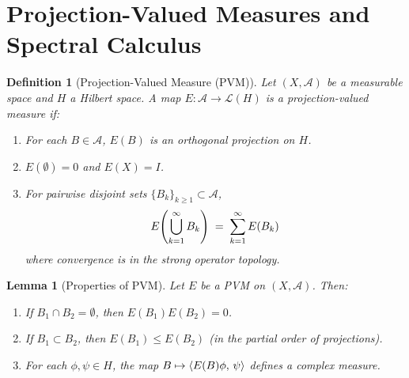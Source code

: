 \documentclass{article}
\newcommand{\tmem}[1]{{\em #1\/}}
\newtheorem{definition}{Definition}
\newtheorem{lemma}{Lemma}
\newcommand{\1}{\mathbbm{1}}
\newcommand{\ip}[2]{\left\langle #1, \hspace{0.17em} #2  \right\rangle}
\begin{document}
\section{Projection-Valued Measures and Spectral Calculus}

\begin{definition}
  [Projection-Valued Measure (PVM)] Let $(X, \mathcal{A})$ be a measurable
  space and $H$ a Hilbert space. A map $E : \mathcal{A} \to \mathcal{L} (H)$
  is a {\tmem{projection-valued measure}} if:
  \begin{enumerate}
    \item For each $B \in \mathcal{A}$, $E (B)$ is an orthogonal projection on
    $H$.
    
    \item $E (\emptyset) = 0$ and $E (X) = I$.
    
    \item For pairwise disjoint sets $\{B_k \}_{k \geq 1} \subset
    \mathcal{A}$,
    \begin{equation}
      E \hspace{-0.17em} \left( \bigcup_{k = 1}^{\infty} B_k \right)
      \hspace{0.27em} = \hspace{0.27em} \sum_{k = 1}^{\infty} E (B_k)
    \end{equation}
    where convergence is in the strong operator topology.
  \end{enumerate}
\end{definition}

\begin{lemma}
  [Properties of PVM]\label{lem:pvm_properties} Let $E$ be a PVM on $(X,
  \mathcal{A})$. Then:
  \begin{enumerate}
    \item If $B_1 \cap B_2 = \emptyset$, then $E (B_1) E (B_2) = 0$.
    
    \item If $B_1 \subset B_2$, then $E (B_1) \leq E (B_2)$ (in the partial
    order of projections).
    
    \item For each $\phi, \psi \in H$, the map $B \mapsto \ip{E (B)
    \phi}{\psi}$ defines a complex measure.
  \end{enumerate}
\end{lemma}
\end{document}
